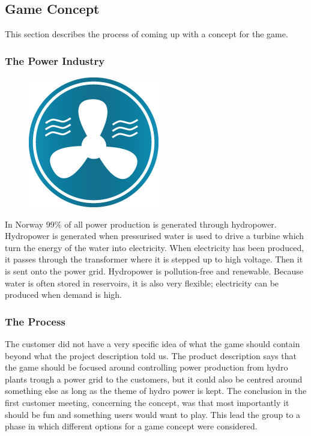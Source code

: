 \subsection{Game Concept}

This section describes the process of coming up with a concept for the game.

\subsubsection{The Power Industry}

\begin{figure}
  \begin{center}
  \includegraphics[scale=0.5]{pictures/water_generator.png}
  \end{center}
\end{figure}

In Norway 99\% of all power production is generated through hydropower. Hydropower is generated when pressurised water is used to drive a turbine which turn the energy of the water into electricity. When electricity has been produced, it passes through the transformer where it is stepped up to high voltage. Then it is sent onto the power grid. Hydropower is pollution-free and renewable. Because water is often stored in reservoirs, it is also very flexible; electricity can be produced when demand is high.

\subsubsection{The Process}

The customer did not have a very specific idea of what the game should contain
beyond what the project description told us. The product description says
that the game should be focused around controlling power production from
hydro plants trough a power grid to the customers, but it could also be
centred around something else as long as the theme of hydro power is kept. The
conclusion in the first customer meeting, concerning the concept, was that
most importantly it should be fun and something users would want to play. This
lead the group to a phase in which different options for a game concept were
considered.


